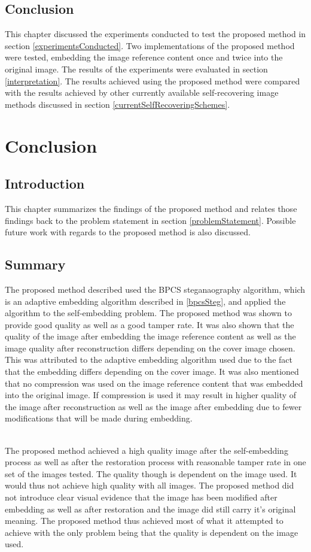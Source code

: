 \documentclass[12pt]{article}
\begin{document}
\subsection{Conclusion}
This chapter discussed the experiments conducted to test the proposed method in section \ref{experimentsConducted}.
Two implementations of the proposed method were tested, embedding the image reference content once and twice into the original image.
The results of the experiments were evaluated in section \ref{interpretation}.
The results achieved using the proposed method were compared with the results achieved by other currently available self-recovering image methods discussed in section \ref{currentSelfRecoveringSchemes}.  

\section{Conclusion}
\subsection{Introduction}
This chapter summarizes the findings of the proposed method and relates those findings back to the problem statement in section \ref{problemStatement}.
Possible future work with regards to the proposed method is also discussed.

\subsection{Summary}
The proposed method described used the BPCS steganaography algorithm, which is an adaptive embedding algorithm described in \ref{bpcsSteg}, and applied the algorithm to the self-embedding problem.
The proposed method was shown to provide good quality as well as a good tamper rate.
It was also shown that the quality of the image after embedding the image reference content as well as the image quality after reconstruction differs depending on the cover image chosen.
This was attributed to the adaptive embedding algorithm used due to the fact that the embedding differs depending on the cover image.
It was also mentioned that no compression was used on the image reference content that was embedded into the original image.
If compression is used it may result in higher quality of the image after reconstruction as well as the image after embedding due to fewer modifications that will be made during embedding.

\hspace{0pt} \\
The proposed method achieved a high quality image after the self-embedding process as well as after the restoration process with reasonable tamper rate in one set of the images tested. The quality though is dependent on the image used. 
It would thus not achieve high quality with all images.
The proposed method did not introduce clear visual evidence that the image has been modified after embedding as well as after restoration and the image did still carry it's original meaning.
The proposed method thus achieved most of what it attempted to achieve with the only problem being that the quality is dependent on the image used.
 
\end{document}
